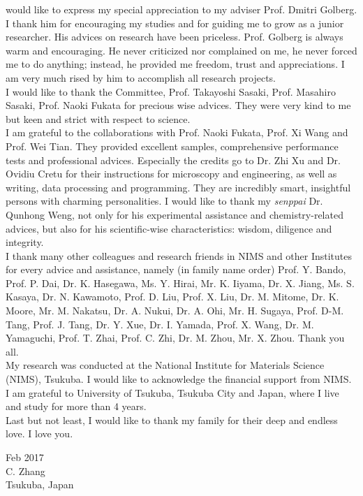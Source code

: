 
 would like to express my special appreciation to my adviser Prof. Dmitri Golberg. I thank him for encouraging my studies and for guiding me to grow as a junior researcher. His advices on research have been priceless. Prof. Golberg is always warm and encouraging. He never criticized nor complained on me, he never forced me to do anything; instead, he provided me freedom, trust and appreciations. I am very much rised by him to accomplish all research projects. \\
I would like to thank the Committee, Prof. Takayoshi Sasaki, Prof. Masahiro Sasaki, Prof. Naoki Fukata for precious wise advices. They were very kind to me but keen and strict with respect to science. \\
I am grateful to the collaborations with Prof. Naoki Fukata, Prof. Xi Wang and Prof. Wei Tian. They provided excellent samples, comprehensive performance tests and professional advices. 
Especially the credits go to Dr. Zhi Xu and Dr. Ovidiu Cretu for their instructions for microscopy and engineering, as well as writing, data processing and programming. They are incredibly smart, insightful persons with charming personalities. 
I would like to thank my {\em senppai} Dr. Qunhong Weng, not only for his experimental assistance and chemistry-related advices, but also for his scientific-wise characteristics: wisdom, diligence and integrity. \\
I thank many other colleagues and research friends in NIMS and other Institutes for every advice and assistance, namely (in family name order) Prof. Y. Bando, Prof. P. Dai, Dr. K. Hasegawa, Ms. Y. Hirai, Mr. K. Iiyama, Dr. X. Jiang, Ms. S. Kasaya, Dr. N. Kawamoto, Prof. D. Liu, Prof. X. Liu, Dr. M. Mitome, Dr. K. Moore, Mr. M. Nakatsu, Dr. A. Nukui, Dr. A. Ohi, Mr. H. Sugaya, Prof. D-M. Tang, Prof. J. Tang, Dr. Y. Xue, Dr. I. Yamada, Prof. X. Wang, Dr. M. Yamaguchi, Prof. T. Zhai, Prof. C. Zhi, Dr. M. Zhou, Mr. X. Zhou. Thank you all. 
\\
My research was conducted at the National Institute for Materials Science (NIMS), Tsukuba. I would like to acknowledge the financial support from NIMS. \\
I am grateful to University of Tsukuba, Tsukuba City and Japan, where I live and study for more than 4 years. \\
Last but not least, I would like to thank my family for their deep and endless love. I love you. \\[9ex]

\begin{flushright}
Feb 2017\\
C. Zhang\\
Tsukuba, Japan
\end{flushright}

